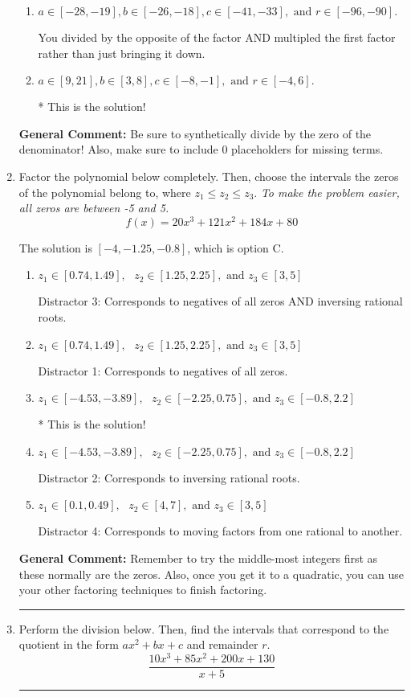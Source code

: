 \documentclass{extbook}[14pt]
\newcommand{\litem}[1]{\item #1

\rule{\textwidth}{0.4pt}}
\begin{document}
\begin{enumerate}
{\begin{enumerate}[label=\Alph*.]
 You divided by the opposite of the factor.
\item \( a \in [-28, -19], b \in [-26, -18], c \in [-41, -33], \text{ and } r \in [-96, -90]. \)

 You divided by the opposite of the factor AND multipled the first factor rather than just bringing it down.
\item \( a \in [9, 21], b \in [3, 8], c \in [-8, -1], \text{ and } r \in [-4, 6]. \)

* This is the solution!
\end{enumerate}

\textbf{General Comment:} Be sure to synthetically divide by the zero of the denominator! Also, make sure to include 0 placeholders for missing terms.
}
\litem{
Factor the polynomial below completely. Then, choose the intervals the zeros of the polynomial belong to, where $z_1 \leq z_2 \leq z_3$. \textit{To make the problem easier, all zeros are between -5 and 5.}
\[ f(x) = 20x^{3} +121 x^{2} +184 x + 80 \]

The solution is \( [-4, -1.25, -0.8] \), which is option C.\begin{enumerate}[label=\Alph*.]
\item \( z_1 \in [0.74, 1.49], \text{   }  z_2 \in [1.25, 2.25], \text{   and   } z_3 \in [3, 5] \)

 Distractor 3: Corresponds to negatives of all zeros AND inversing rational roots.
\item \( z_1 \in [0.74, 1.49], \text{   }  z_2 \in [1.25, 2.25], \text{   and   } z_3 \in [3, 5] \)

 Distractor 1: Corresponds to negatives of all zeros.
\item \( z_1 \in [-4.53, -3.89], \text{   }  z_2 \in [-2.25, 0.75], \text{   and   } z_3 \in [-0.8, 2.2] \)

* This is the solution!
\item \( z_1 \in [-4.53, -3.89], \text{   }  z_2 \in [-2.25, 0.75], \text{   and   } z_3 \in [-0.8, 2.2] \)

 Distractor 2: Corresponds to inversing rational roots.
\item \( z_1 \in [0.1, 0.49], \text{   }  z_2 \in [4, 7], \text{   and   } z_3 \in [3, 5] \)

 Distractor 4: Corresponds to moving factors from one rational to another.
\end{enumerate}

\textbf{General Comment:} Remember to try the middle-most integers first as these normally are the zeros. Also, once you get it to a quadratic, you can use your other factoring techniques to finish factoring.
}
\litem{
Perform the division below. Then, find the intervals that correspond to the quotient in the form $ax^2+bx+c$ and remainder $r$.
\[ \frac{10x^{3} +85 x^{2} +200 x + 130}{x + 5} \]

}
\end{enumerate}
\end{document}
